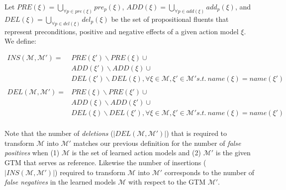 \begin{mydefinition}
	Let $PRE(\xi) = \underset{\forall p \in pre(\xi)}{\bigcup} pre_p(\xi)$, $ADD(\xi) = \underset{\forall p \in add(\xi)}{\bigcup} add_p(\xi)$, and $DEL(\xi) = \underset{\forall p \in del(\xi)}{\bigcup} del_p(\xi)$ be the set of propositional fluents that represent preconditions, positive and negative effects of a given action model $\xi$. We define:
	\begin{small}
		\begin{align*}
		INS(\mathcal{M}, \mathcal{M'})=&PRE(\xi') \backslash PRE(\xi) \cup\\
		&ADD(\xi') \backslash ADD(\xi) \cup \\
		&DEL(\xi') \backslash DEL(\xi),\forall \xi\in\mathcal{M}, \xi'\in\mathcal{M'} s.t.\ name(\xi) = name(\xi')\\
		\\
		DEL(\mathcal{M}, \mathcal{M'})=&PRE(\xi) \backslash PRE(\xi') \cup\\
		&ADD(\xi) \backslash ADD(\xi') \cup \\
		&DEL(\xi) \backslash DEL(\xi'),\forall \xi\in\mathcal{M}, \xi'\in\mathcal{M'} s.t.\ name(\xi) = name(\xi')\\
		\end{align*}
	\end{small}
\end{mydefinition}

Note that the number of {\em deletions} ($\left|DEL(\mathcal{M},\mathcal{M'})\right|$) that is required to transform $\mathcal{M}$ into $\mathcal{M}'$ matches our previous definition for the number of {\em false positives} when (1) $\mathcal{M}$ is the set of learned action models and (2) $\mathcal{M}'$ is the given GTM that serves as reference. Likewise the number of insertions ($\left|INS(\mathcal{M},\mathcal{M'})\right|$) required to transform $\mathcal{M}$ into $\mathcal{M}'$ corresponds to the number of {\em false negatives} in the learned models $\mathcal{M}$ with respect to the GTM $\mathcal{M}'$.


